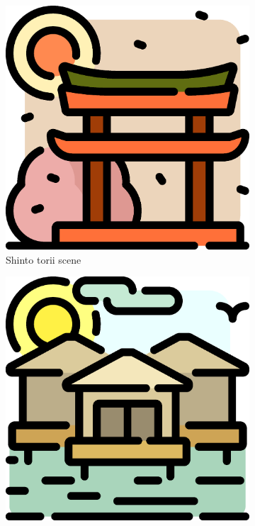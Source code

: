 \documentclass[runningheads, a4paper]{llncs}
\begin{document}
        \begin{figure}
            \begin{center}
                \begin{subfigure}[h]{0.4 \linewidth}
                    \includegraphics[width=\linewidth]{images/shinto-japan-svgrepo-com.svg.eps}
                    \caption{Shinto torii scene}
                    \label{fig:toriiAndRiver:torii}
                \end{subfigure}
                \hfill
                \begin{subfigure}[h]{0.4 \linewidth}
                    \includegraphics[width=\linewidth]{images/landscape-river-svgrepo-com.svg.eps}

\end{subfigure}
\end{center}
\end{figure}
\end{document}
